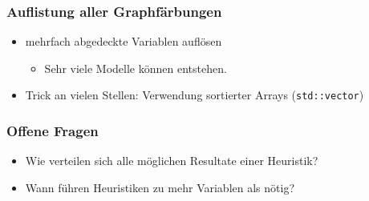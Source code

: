 \documentclass[onlymath]{beamer}
\begin{document}
\begin{frame}
	\frametitle{Auflistung aller Graphfärbungen}
	\begin{itemize}
		\item mehrfach abgedeckte Variablen auflösen\pause
		\begin{itemize}
			\item Sehr viele Modelle können entstehen.
		\end{itemize} \pause
		\item Trick an vielen Stellen: Verwendung sortierter Arrays (\texttt{std::vector}) \pause
		
	\end{itemize}
\end{frame}

\begin{frame}
	\frametitle{Offene Fragen}
	\begin{itemize}
		\item Wie verteilen sich alle möglichen Resultate einer Heuristik?\pause
		\item Wann führen Heuristiken zu mehr Variablen als nötig?
	\end{itemize}
\end{frame}
\end{document}
